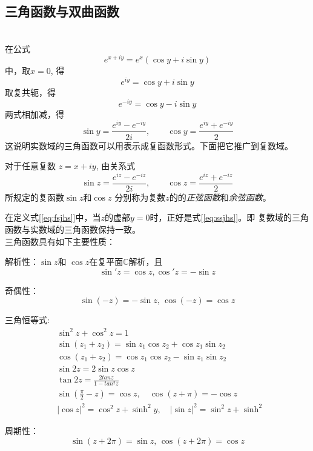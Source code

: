 \subsection{三角函数与双曲函数}
~\\
在公式
\[ e^{x+iy}  = e^x (\cos y + i \sin y) \]
中，取$x=0$, 得 
\[ e^{iy}  = \cos y + i \sin y \]
取复共轭，得
\[ e^{-iy}  = \cos y - i \sin y \]
两式相加减，得 
\begin{equation}\label{eq:ssjhs}
  \sin y =  \frac{e^{iy} - e^{-iy} }{2i}, \qquad \cos y =  \frac{e^{iy} + e^{-iy} }{2}
\end{equation}
这说明实数域的三角函数可以用表示成复函数形式。下面把它推广到复数域。
\begin{definition}
  对于任意复数 $z= x +iy $, 由关系式
  \begin{equation}\label{eq:fsjhs}
    \sin z =  \frac{e^{iz} - e^{-iz} }{2i}, \qquad \cos z =  \frac{e^{iz} + e^{-iz} }{2}
  \end{equation}
所规定的复函数$\sin z$和$\cos z$ 分别称为复数$z$的的\emph{正弦函数}和\emph{余弦函数}。
\end{definition}
在定义式[\ref{eq:fsjhs}]中，当$z$的虚部$y=0$时，正好是式[\ref{eq:ssjhs}]。即 复数域的三角函数与实数域的三角函数保持一致。\\
三角函数具有如下主要性质：
\begin{compactenum}[(a)]
	\item 解析性：$\sin z $和 $\cos z $在复平面$\mathbb{C}$解析，且
  \begin{equation}
   \sin' z = \cos z , \cos' z = -\sin z  
  \end{equation}
  \item 奇偶性：
  \begin{equation}
    \sin (-z) = - \sin z, \,\cos (-z) = \cos z
  \end{equation}
	\item 三角恒等式: 
  \begin{equation} 
    \begin{aligned}
      & \sin^2 z + \cos^2 z =1 \\
      & \sin(z_1 +z_2) = \sin z_1 \cos z_2 + \cos z_1 \sin z_2 \\
      & \cos(z_1 +z_2) = \cos z_1 \cos z_2 - \sin z_1 \sin z_2  \\
      & \sin 2 z = 2 \sin z \cos z \\
      & \tan 2 z = \frac{2 tan z}{1- tan ^2 z} \\
      & \sin \left( \frac{\pi}{2}- z\right) = \cos z, \quad \cos(z+ \pi) = - \cos z \\
      & |\cos z|^2 = \cos ^2 z + \sinh^2 y, \quad |\sin z|^2 = \sin ^2 z + \sinh^2
    \end{aligned}
  \end{equation}
	\item 周期性：
	\begin{equation}
    \sin(z+2\pi) = \sin z, \, \cos(z+2\pi) = \cos z
  \end{equation}
\end{compactenum}

